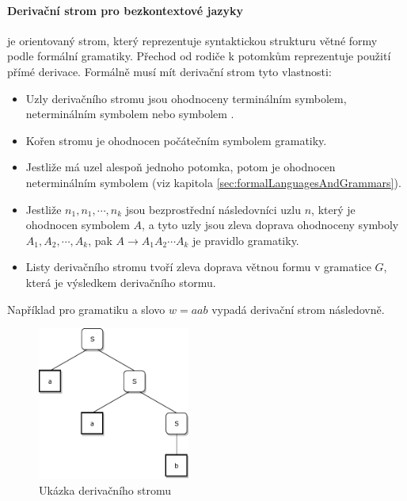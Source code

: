			\paragraph{Derivační strom pro bezkontextové jazyky} je orientovaný strom, který reprezentuje syntaktickou strukturu větné formy podle formální gramatiky. Přechod od rodiče k potomkům reprezentuje použití přímé derivace. Formálně musí mít derivační strom tyto vlastnosti:
			\begin{itemize}
				\item Uzly derivačního stromu jsou ohodnoceny terminálním symbolem, neterminálním symbolem nebo symbolem \Eps.
				\item Kořen stromu je ohodnocen počátečním symbolem gramatiky.
				\item Jestliže má uzel alespoň jednoho potomka, potom je ohodnocen neterminálním symbolem (viz kapitola \ref{sec:formalLanguagesAndGrammars}).
				\item Jestliže $n_1,n_1,\cdots,n_k$ jsou bezprostřední následovníci uzlu  $n$, který je ohodnocen symbolem $A$, a tyto uzly jsou zleva doprava ohodnoceny symboly $A_1,A_2,\cdots,A_k$, pak $A\rightarrow A_1 A_2 \cdots A_k$ je pravidlo gramatiky.
				\item Listy derivačního stromu tvoří zleva doprava větnou formu v gramatice $G$, která je výsledkem derivačního stormu.
			\end{itemize}			
			Například pro gramatiku 
			a slovo $w=aab$ vypadá derivační strom následovně.
			\begin{figure}[h!]
				\centering
				\includegraphics[width=5cm]{img/DerivacniStromDemo}
				\caption{Ukázka derivačního stromu}
			\end{figure}
		
